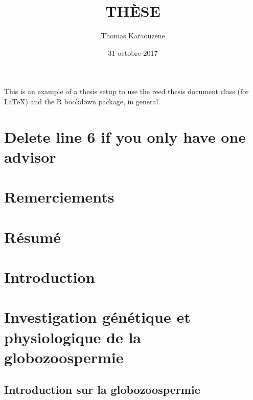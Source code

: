 \documentclass[12pt,twoside]{reedthesis}
\title{THÈSE}
\author{Thomas Karaouzene}
\date{31 octobre 2017}
\theoremstyle{definition}
\theoremstyle{definition}
\theoremstyle{remark}
\begin{document}
      \maketitle
  
  \frontmatter %
  \pagestyle{empty} %

  
      \begin{preface}
      This is an example of a thesis setup to use the reed thesis document
      class (for LaTeX) and the R bookdown package, in general.
    \end{preface}
  
      \hypersetup{linkcolor=black}
    \setcounter{tocdepth}{3}
    \tableofcontents
  
      \listoftables
  
      \listoffigures
  
  
  
  \mainmatter %
  \pagestyle{fancyplain} %

  \chapter{Delete line 6 if you only have one
  advisor}\label{delete-line-6-if-you-only-have-one-advisor}
  
  \chapter*{Remerciements}\label{remerciements}
  
  \chapter*{Résumé}\label{resume}
  
  \chapter{Introduction}\label{introInf}
  
  \chapter{Investigation génétique et physiologique de la
  globozoospermie}\label{globo}
  
  \section{Introduction sur la
  globozoospermie}\label{introduction-sur-la-globozoospermie}
  
\end{document}
